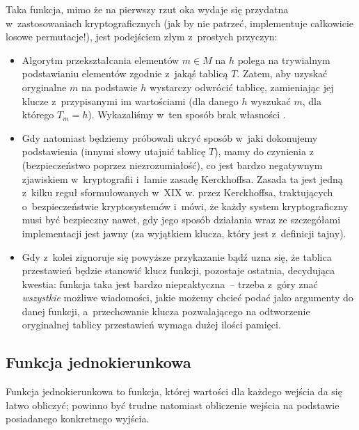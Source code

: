 Taka funkcja, mimo że na pierwszy rzut oka wydaje się przydatna
w~zastosowaniach kryptograficznych (jak by nie patrzeć, implementuje całkowicie
losowe permutacje!), jest podejściem złym z~prostych przyczyn:

\begin{itemize}

    \item Algorytm przekształcania elementów $m \in M$ na $h$ polega na
    trywialnym podstawianiu elementów zgodnie z~jakąś tablicą $T$. Zatem, aby
    uzyskać oryginalne $m$ na podstawie $h$ wystarczy odwrócić tablicę,
    zamieniając jej klucze z~przypisanymi im wartościami (dla danego $h$
    wyszukać $m$, dla którego $T_m = h$). Wykazaliśmy w~ten sposób brak
    własności .

    \item Gdy natomiast będziemy próbowali ukryć sposób w~jaki dokonujemy
    podstawienia (innymi słowy utajnić tablicę $T$), mamy do czynienia
    z~ (bezpieczeństwo poprzez niezrozumiałość),
    co jest bardzo negatywnym zjawiskiem w~kryptografii i~łamie zasadę
    Kerckhoffsa. Zasada ta jest jedną z~kilku reguł sformułowanych w~XIX w.
    przez Kerckhoffsa, traktujących o~bezpieczeństwie kryptosystemów i~mówi,
    że każdy system kryptograficzny musi być bezpieczny nawet, gdy jego sposób
    działania wraz ze szczegółami implementacji jest jawny (za wyjątkiem
    klucza, który jest z~definicji tajny).

    \item
    Gdy z~kolei zignoruje się powyższe przykazanie bądź uzna się, że tablica
    przestawień będzie stanowić klucz funkcji, pozostaje ostatnia,
    decydująca kwestia: funkcja taka jest bardzo niepraktyczna~-- trzeba z~góry
    znać \emph{wszystkie} możliwe wiadomości, jakie możemy chcieć podać jako
    argumenty do danej funkcji, a~przechowanie klucza pozwalającego na
    odtworzenie oryginalnej tablicy przestawień wymaga dużej ilości pamięci.

\end{itemize}



\subsection{Funkcja jednokierunkowa}
Funkcja jednokierunkowa to funkcja, której wartości dla każdego wejścia da się
łatwo obliczyć; powinno być trudne natomiast obliczenie wejścia na podstawie
posiadanego konkretnego wyjścia.

